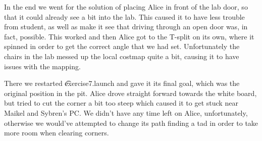 In the end we went for the solution of placing Alice in front of the lab door, so that it could already see a bit into the lab. This caused it to have less trouble from student, as well as make it see that driving through an open door was, in fact, possible. This worked and then Alice got to the T-split on its own, where it spinned in order to get the correct angle that we had set. Unfortunately the chairs in the lab messed up the local costmap quite a bit, causing it to have issues with the mapping. 

There we restarted \t{exercise7.launch} and gave it its final goal, which was the original position in the pit. Alice drove straight forward towards the white board, but tried to cut the corner a bit too steep which caused it to get stuck near Maikel and Sybren's PC. We didn't have any time left on Alice, unfortunately, otherwise we would've attempted to change its path finding a tad in order to take more room when clearing corners.